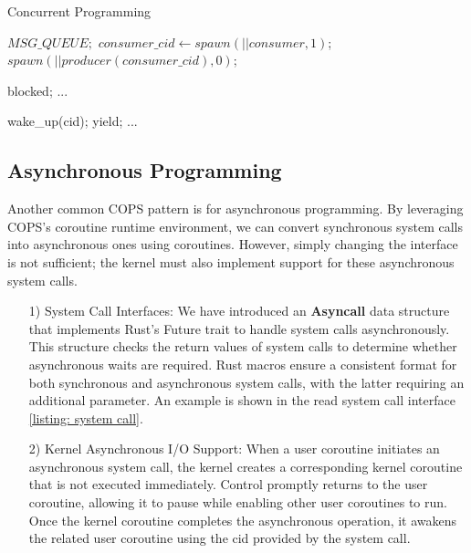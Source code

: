 \documentclass[conference]{IEEEtran}
\begin{document}
\begin{algorithm}[!ht]
  \caption{Concurrent Programming}
  \label{alg: concurrency}
  \begin{algorithmic}[1]
    \State $MSG\_QUEUE;$
      \State $consumer\_cid \gets spawn(|| consumer, 1)$;
      \State $spawn(|| producer(consumer\_cid), 0)$;
		\EndFunction

      \Loop
          \State blocked;
        \EndWhile
        \State ... 
      \EndLoop
    \EndFunction

      \Loop
          \State wake\_up(cid); 
          \State yield;
        \EndWhile
        \State ... 
      \EndLoop
    \EndFunction
  \end{algorithmic}
\end{algorithm}

\subsection{Asynchronous Programming}

Another common COPS pattern is for asynchronous programming. By leveraging COPS's coroutine runtime environment, we can convert synchronous system calls into asynchronous ones using coroutines. However, simply changing the interface is not sufficient; the kernel must also implement support for these asynchronous system calls.

\begin{itemize}[leftmargin=*]
  \item[1)] System Call Interfaces: We have introduced an \textbf{Asyncall} data structure that implements Rust's Future trait to handle system calls asynchronously. This structure checks the return values of system calls to determine whether asynchronous waits are required. Rust macros ensure a consistent format for both synchronous and asynchronous system calls, with the latter requiring an additional parameter. An example is shown in the read system call interface \ref{listing: system call}.
  \item[2)] Kernel Asynchronous I/O Support: When a user coroutine initiates an asynchronous system call, the kernel creates a corresponding kernel coroutine that is not executed immediately. Control promptly returns to the user coroutine, allowing it to pause while enabling other user coroutines to run. Once the kernel coroutine completes the asynchronous operation, it awakens the related user coroutine using the cid provided by the system call.
\end{itemize}
\end{document}
